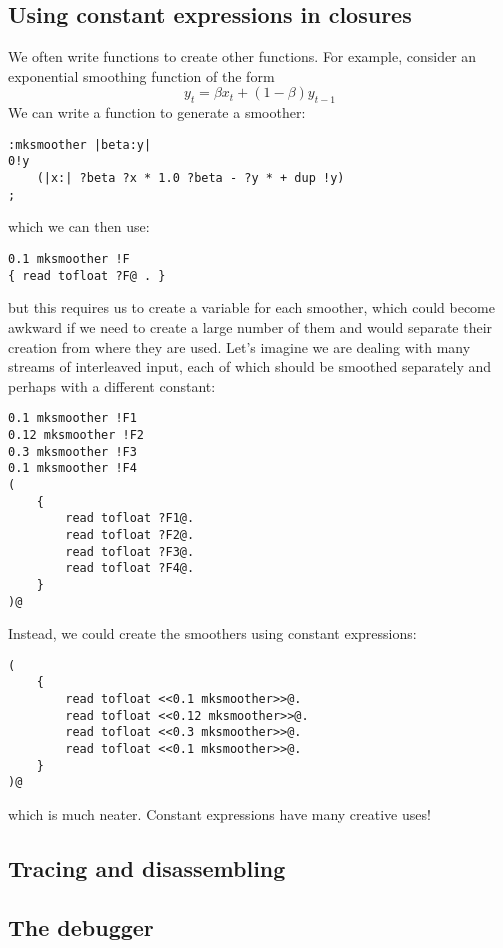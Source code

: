 \subsection{Using constant expressions in closures}
We often write functions to create other functions. For example,
consider an exponential smoothing function of the form
\[
y_t = \beta x_t + (1-\beta)y_{t-1}
\]
We can write a function to generate a smoother:
\begin{lstlisting}
:mksmoother |beta:y|
0!y
    (|x:| ?beta ?x * 1.0 ?beta - ?y * + dup !y)
;   
\end{lstlisting}
which we can then use:
\begin{lstlisting}
0.1 mksmoother !F
{ read tofloat ?F@ . }
\end{lstlisting}
but this requires us to create a variable for each smoother,
which could become awkward if we need to create a large number of them
and would separate their creation from where they are used. Let's imagine
we are dealing with many streams of interleaved input, each of which
should be smoothed separately and perhaps with a different constant:
\begin{lstlisting}
0.1 mksmoother !F1
0.12 mksmoother !F2
0.3 mksmoother !F3
0.1 mksmoother !F4
(
    { 
        read tofloat ?F1@.
        read tofloat ?F2@.
        read tofloat ?F3@.
        read tofloat ?F4@.
    }
)@
\end{lstlisting}
Instead, we could create the smoothers using constant expressions:
\begin{lstlisting}
(
    { 
        read tofloat <<0.1 mksmoother>>@.
        read tofloat <<0.12 mksmoother>>@.
        read tofloat <<0.3 mksmoother>>@.
        read tofloat <<0.1 mksmoother>>@.
    }
)@
\end{lstlisting}
which is much neater. Constant expressions have many creative uses!


\subsection{Tracing and disassembling}


\subsection{The debugger}
